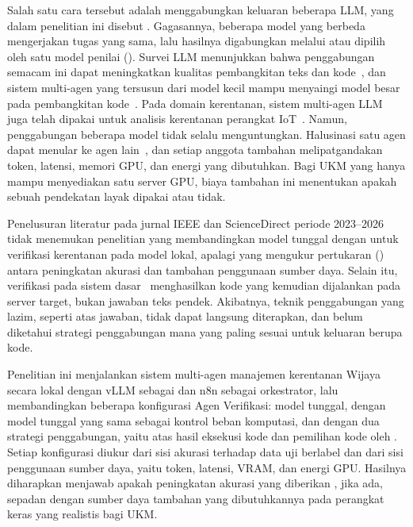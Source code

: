 Salah satu cara tersebut adalah menggabungkan keluaran beberapa LLM, yang dalam
penelitian ini disebut . Gagasannya, beberapa model yang
berbeda mengerjakan tugas yang sama, lalu hasilnya digabungkan melalui
 atau dipilih oleh satu model penilai (). Survei
 LLM menunjukkan bahwa penggabungan semacam ini dapat
meningkatkan kualitas pembangkitan teks dan kode~\cite{ashigaEnsembleLearningLarge2026},
dan sistem multi-agen yang tersusun dari model kecil mampu menyaingi model
besar pada pembangkitan kode~\cite{zhangPowerSmallLLMs2026}. Pada domain
kerentanan, sistem multi-agen LLM juga telah dipakai untuk analisis kerentanan
perangkat IoT~\cite{yangLIVAMultiAgentLLMAssisted}. Namun, penggabungan beberapa
model tidak selalu menguntungkan. Halusinasi satu agen dapat menular ke agen
lain~\cite{zhangBewareWoozleEffect2026}, dan setiap anggota tambahan
melipatgandakan token, latensi, memori GPU, dan energi yang dibutuhkan. Bagi UKM
yang hanya mampu menyediakan satu server GPU, biaya tambahan ini menentukan
apakah sebuah pendekatan layak dipakai atau tidak.

Penelusuran literatur pada jurnal IEEE dan ScienceDirect periode 2023--2026
tidak menemukan penelitian yang membandingkan model tunggal dengan  untuk verifikasi kerentanan pada model lokal, apalagi yang mengukur
pertukaran () antara peningkatan akurasi dan tambahan
penggunaan sumber daya. Selain itu, verifikasi pada sistem
dasar~\cite{wijaya2026} menghasilkan kode yang kemudian dijalankan pada server
target, bukan jawaban teks pendek. Akibatnya, teknik penggabungan yang lazim,
seperti  atas jawaban, tidak dapat langsung diterapkan,
dan belum diketahui strategi penggabungan mana yang paling sesuai untuk
keluaran berupa kode.

Penelitian ini menjalankan sistem multi-agen manajemen kerentanan
Wijaya~\cite{wijaya2026} secara lokal dengan vLLM sebagai 
dan n8n sebagai orkestrator, lalu membandingkan beberapa konfigurasi Agen
Verifikasi: model tunggal,  dengan model tunggal yang
sama sebagai kontrol beban komputasi, dan  dengan dua
strategi penggabungan, yaitu  atas hasil eksekusi kode dan
pemilihan kode oleh . Setiap konfigurasi diukur dari sisi
akurasi terhadap data uji berlabel dan dari sisi penggunaan sumber daya, yaitu
token, latensi, VRAM, dan energi GPU. Hasilnya diharapkan menjawab apakah
peningkatan akurasi yang diberikan , jika ada, sepadan dengan
sumber daya tambahan yang dibutuhkannya pada perangkat keras yang realistis bagi
UKM.

